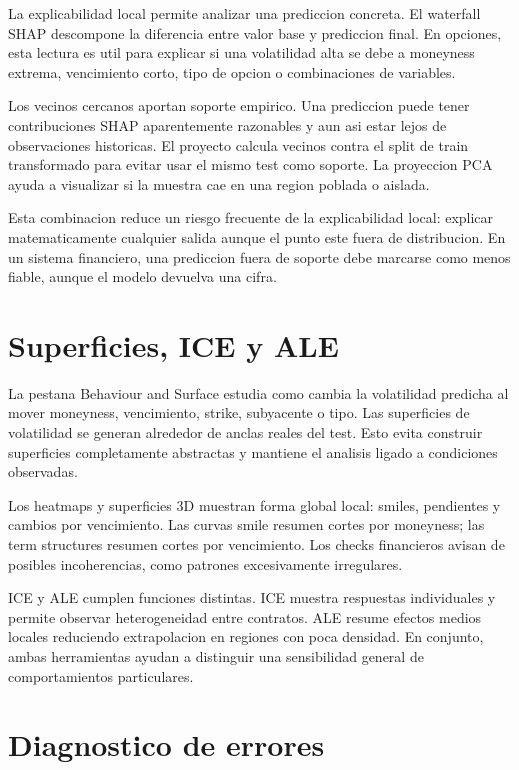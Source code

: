 La explicabilidad local permite analizar una prediccion concreta. El waterfall SHAP descompone la diferencia entre valor base y prediccion final. En opciones, esta lectura es util para explicar si una volatilidad alta se debe a moneyness extrema, vencimiento corto, tipo de opcion o combinaciones de variables.

Los vecinos cercanos aportan soporte empirico. Una prediccion puede tener contribuciones SHAP aparentemente razonables y aun asi estar lejos de observaciones historicas. El proyecto calcula vecinos contra el split de train transformado para evitar usar el mismo test como soporte. La proyeccion PCA ayuda a visualizar si la muestra cae en una region poblada o aislada.

Esta combinacion reduce un riesgo frecuente de la explicabilidad local: explicar matematicamente cualquier salida aunque el punto este fuera de distribucion. En un sistema financiero, una prediccion fuera de soporte debe marcarse como menos fiable, aunque el modelo devuelva una cifra.

\section{Superficies, ICE y ALE}

La pestana Behaviour and Surface estudia como cambia la volatilidad predicha al mover moneyness, vencimiento, strike, subyacente o tipo. Las superficies de volatilidad se generan alrededor de anclas reales del test. Esto evita construir superficies completamente abstractas y mantiene el analisis ligado a condiciones observadas.

Los heatmaps y superficies 3D muestran forma global local: smiles, pendientes y cambios por vencimiento. Las curvas smile resumen cortes por moneyness; las term structures resumen cortes por vencimiento. Los checks financieros avisan de posibles incoherencias, como patrones excesivamente irregulares.

ICE y ALE cumplen funciones distintas. ICE muestra respuestas individuales y permite observar heterogeneidad entre contratos. ALE resume efectos medios locales reduciendo extrapolacion en regiones con poca densidad. En conjunto, ambas herramientas ayudan a distinguir una sensibilidad general de comportamientos particulares.

\section{Diagnostico de errores}

